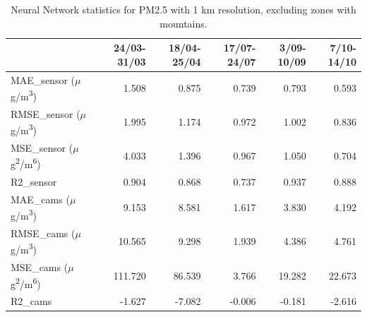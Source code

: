 \begin{table}[H]
\begin{tabular}{lrrrrr}
\toprule
 &  24/03-31/03 &  18/04-25/04 &  17/07-24/07 &  3/09-10/09 &  7/10-14/10 \\
\midrule
 MAE\_sensor ($\mu$g/m\textsuperscript{3})&        1.508 &        0.875 &        0.739 &       0.793 &       0.593 \\
RMSE\_sensor ($\mu$g/m\textsuperscript{3})&        1.995 &        1.174 &        0.972 &       1.002 &       0.836 \\
 MSE\_sensor ($\mu$g\textsuperscript{2}/m\textsuperscript{6})&        4.033 &        1.396 &        0.967 &       1.050 &       0.704 \\
  R2\_sensor &        0.904 &        0.868 &        0.737 &       0.937 &       0.888 \\
   MAE\_cams ($\mu$g/m\textsuperscript{3})&        9.153 &        8.581 &        1.617 &       3.830 &       4.192 \\
  RMSE\_cams ($\mu$g/m\textsuperscript{3})&       10.565 &        9.298 &        1.939 &       4.386 &       4.761 \\
   MSE\_cams ($\mu$g\textsuperscript{2}/m\textsuperscript{6})&      111.720 &       86.539 &        3.766 &      19.282 &      22.673 \\
    R2\_cams &       -1.627 &       -7.082 &       -0.006 &      -0.181 &      -2.616 \\
\bottomrule
\end{tabular}
\caption{Neural Network statistics for PM2.5 with 1 km resolution, excluding zones with mountains.}
\end{table}
